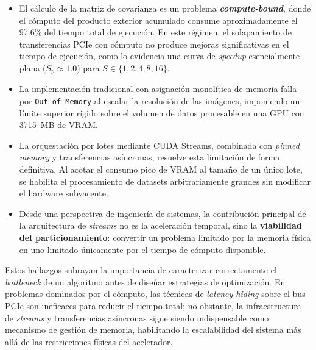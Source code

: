 \documentclass[12pt, a4paper]{article}
\begin{document}
\begin{itemize}
    \item El cálculo de la matriz de covarianza es un problema
    \textbf{\textit{compute-bound}}, donde el cómputo del producto exterior
    acumulado consume aproximadamente el 97.6\% del tiempo total de ejecución.
    En este régimen, el solapamiento de transferencias PCIe con cómputo no
    produce mejoras significativas en el tiempo de ejecución, como lo evidencia
    una curva de \textit{speedup} esencialmente plana ($S_p \approx 1.0$) para
    $S \in \{1, 2, 4, 8, 16\}$.

    \item La implementación tradicional con asignación monolítica de memoria
    falla por \texttt{Out of Memory} al escalar la resolución de las imágenes,
    imponiendo un límite superior rígido sobre el volumen de datos procesable
    en una GPU con 3715~MB de VRAM.

    \item La orquestación por lotes mediante CUDA Streams, combinada con
    \textit{pinned memory} y transferencias asíncronas, resuelve esta
    limitación de forma definitiva. Al acotar el consumo pico de VRAM al
    tamaño de un único lote, se habilita el procesamiento de datasets
    arbitrariamente grandes sin modificar el hardware subyacente.

    \item Desde una perspectiva de ingeniería de sistemas, la contribución
    principal de la arquitectura de \textit{streams} no es la aceleración
    temporal, sino la \textbf{viabilidad del particionamiento}: convertir un
    problema limitado por la memoria física en uno limitado únicamente por el
    tiempo de cómputo disponible.
\end{itemize}

Estos hallazgos subrayan la importancia de caracterizar correctamente el
\textit{bottleneck} de un algoritmo antes de diseñar estrategias de
optimización. En problemas dominados por el cómputo, las técnicas de
\textit{latency hiding} sobre el bus PCIe son ineficaces para reducir el
tiempo total; no obstante, la infraestructura de \textit{streams} y
transferencias asíncronas sigue siendo indispensable como mecanismo de gestión
de memoria, habilitando la escalabilidad del sistema más allá de las
restricciones físicas del acelerador.
\end{document}

